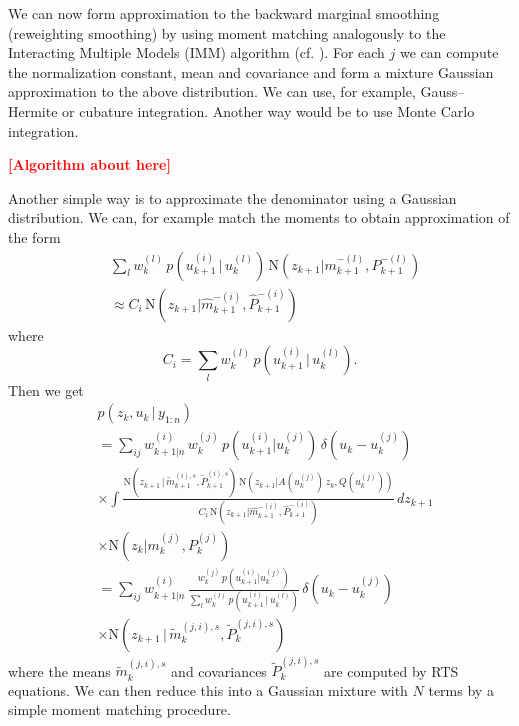 \documentclass[twocolumn]{autart}    %
\newcommand{\comment}[1]{\textcolor{red}{\textbf{[#1]}}}
\begin{document}
%
We can now form approximation to the backward marginal smoothing
(reweighting smoothing) by using moment matching analogously to the
Interacting Multiple Models (IMM) algorithm
\cite{Bar-Shalom+Li+Kirubarajan:2001} (cf. \cite{Barber:2006}). For
each $j$ we can compute the normalization constant, mean and
covariance and form a mixture Gaussian approximation to the above
distribution. We can use, for example, Gauss--Hermite or cubature
integration. Another way would be to use Monte Carlo integration.

\comment{Algorithm about here}

Another simple way is to approximate the denominator using a Gaussian
distribution. We can, for example match the moments to obtain
approximation of the form
%
\begin{equation}
\begin{split}
  &\sum_l w_k^{(l)} \, p(u_{k+1}^{(i)}\,|\,u_k^{(l)}) \,
            \mathrm{N}(z_{k+1} | m^{-(l)}_{k+1}, P^{-(l)}_{k+1}) \\
  &\approx
  C_i \, \mathrm{N}(z_{k+1} | \hat{m}^{-(i)}_{k+1}, \hat{P}^{-(i)}_{k+1})
\end{split}
\end{equation}
%
where
%
\begin{equation}
  C_i = \sum_l w_k^{(l)} \, p(u_{k+1}^{(i)}\,|\,u_k^{(l)}).
\end{equation}
%
Then we get
%
\begin{equation}
\begin{split}
 &p(z_{k},u_{k} \,|\, y_{1:n}) \\
 &= \sum_{ij} w^{(i)}_{k+1|n} \, w_k^{(j)} \,
      p(u_{k+1}^{(i)} | u_k^{(j)}) \, \delta(u_{k} - u_{k}^{(j)}) \\
 &\times \int
    \frac{\mathrm{N}(z_{k+1}\,|\,\tilde{m}_{k+1}^{(i),s},\tilde{P}_{k+1}^{(i),s}) \,
          \mathrm{N}(z_{k+1} | A(u_k^{(j)}) \, z_k, Q(u_k^{(j)}))}
        {C_i \, \mathrm{N}(z_{k+1} | \hat{m}^{-(i)}_{k+1}, \hat{P}^{-(i)}_{k+1})} \, dz_{k+1} \\
 &\times \mathrm{N}(z_{k} | m^{(j)}_{k}, P^{(j)}_{k}) \\
 &= \sum_{ij} w^{(i)}_{k+1|n} \,
    \frac{w_k^{(j)} \, p(u_{k+1}^{(i)} | u_k^{(j)})}
         {\sum_l w_k^{(l)} \, p(u_{k+1}^{(i)}\,|\,u_k^{(l)})} \, \delta(u_{k} - u_{k}^{(j)}) \\
 &\times \mathrm{N}(z_{k+1}\,|\,\tilde{m}_{k}^{(j,i),s},\tilde{P}_{k}^{(j,i),s}) \,
\end{split}
\label{eq:simplerbrw}
\end{equation}
%
where the means $\tilde{m}_{k}^{(j,i),s}$ and covariances
$\tilde{P}_{k}^{(j,i),s}$ are computed by RTS equations. We can then
reduce this into a Gaussian mixture with $N$ terms by a simple moment
matching procedure.
\end{document}
